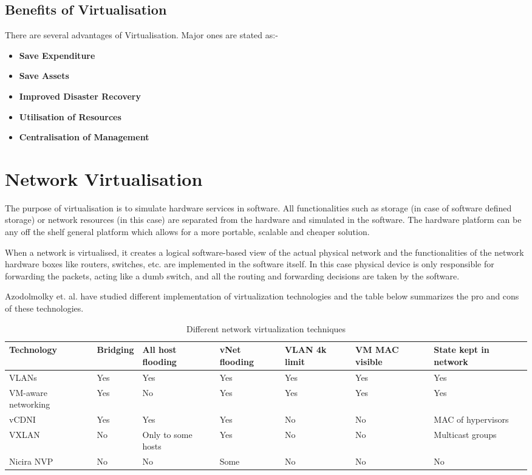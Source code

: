 \subsection{Benefits of Virtualisation}

There are several advantages of Virtualisation. Major ones are stated as:- 

\begin{itemize}
    \item \textbf{Save Expenditure}
     \item \textbf{Save Assets}
      \item \textbf{Improved Disaster Recovery}
       \item \textbf{Utilisation of Resources}
        \item \textbf{Centralisation of Management}
\end{itemize}


\section{Network Virtualisation}
The purpose of virtualisation is to simulate hardware services in software. All functionalities such as storage (in case of software defined storage) or network resources (in this case) are separated from the hardware and simulated in the software. The hardware platform can be any off the shelf general platform which allows for a more portable, scalable and cheaper solution.

When a network is virtualised, it creates a logical software-based view of the actual physical network and the functionalities of the network hardware boxes like routers, switches, etc. are implemented in the software itself. In this case physical device is only responsible for forwarding the packets, acting like a dumb switch, and all the routing and forwarding decisions are taken by the software.

Azodolmolky et. al. \cite{azodolmolky2013sdn} have studied different implementation of virtualization technologies and the table below summarizes the pro and cons of these technologies.

\begin{table}
\centering
\begin{tabular}{| p{6em} | p{5em} | p{1cm} | p{1cm} | p{5em} | p{5em} | p{5em} |}
\hline
{\bf Technology} & {\bf Bridging} & {\bf All host flooding } & {\bf vNet flooding} & {\bf VLAN 4k limit} & {\bf VM MAC visible} & {\bf State kept in network}\\ \hline
%
VLANs & Yes & Yes & Yes & Yes & Yes & Yes \\ \hline
%
VM-aware networking & Yes & No & Yes & Yes & Yes & Yes \\ \hline
vCDNI & Yes & Yes & Yes & No & No & MAC of hypervisors \\ \hline
VXLAN & No & Only to some hosts & Yes & No & No & Multicast groups \\ \hline
Nicira NVP & No & No & Some & No & No & No \\ \hline
\end{tabular}
\caption{Different network virtualization techniques}
\label{table:1}
\end{table}

